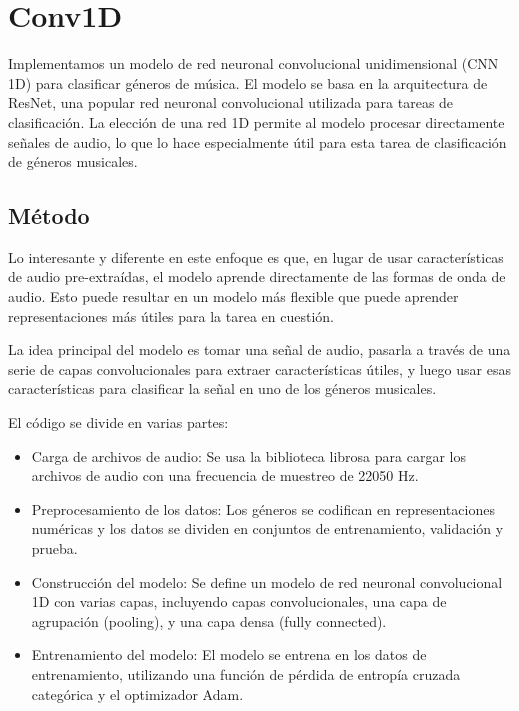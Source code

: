 \documentclass[colorinlistoftodos,twoside,twocolumn,10pt]{article} %
\begin{document}
\section{Conv1D}
Implementamos un modelo de red neuronal convolucional unidimensional (CNN 1D) para clasificar g\'eneros de m\'usica. El modelo se basa en la arquitectura de ResNet, una popular red neuronal convolucional utilizada para tareas de clasificaci\'on. La elecci\'on de una red 1D permite al modelo procesar directamente se\~nales de audio, lo que lo hace especialmente \'util para esta tarea de clasificaci\'on de g\'eneros musicales.

\subsection{M\'etodo}
Lo interesante y diferente en este enfoque es que, en lugar de usar caracter\'isticas de audio pre-extra\'idas, el modelo aprende directamente de las formas de onda de audio. Esto puede resultar en un modelo m\'as flexible que puede aprender representaciones m\'as \'utiles para la tarea en cuesti\'on.

La idea principal del modelo es tomar una se\~nal de audio, pasarla a trav\'es de una serie de capas convolucionales para extraer caracter\'isticas \'utiles, y luego usar esas caracter\'isticas para clasificar la se\~nal en uno de los g\'eneros musicales.

El c\'odigo se divide en varias partes:
\begin{itemize}
\item Carga de archivos de audio: Se usa la biblioteca librosa para cargar los archivos de audio con una frecuencia de muestreo de 22050 Hz.
\item Preprocesamiento de los datos: Los g\'eneros se codifican en representaciones num\'ericas y los datos se dividen en conjuntos de entrenamiento, validaci\'on y prueba.
\item Construcci\'on del modelo: Se define un modelo de red neuronal convolucional 1D con varias capas, incluyendo capas convolucionales, una capa de agrupaci\'on (pooling), y una capa densa (fully connected).
\item Entrenamiento del modelo: El modelo se entrena en los datos de entrenamiento, utilizando una funci\'on de p\'erdida de entrop\'ia cruzada categ\'orica y el optimizador Adam.
\end{itemize}
\end{document}
